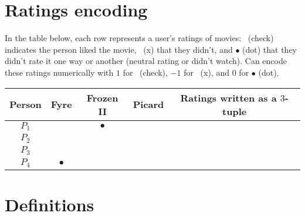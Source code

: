 \documentclass[12pt, oneside]{article}
\newcommand{\cmark}{\ding{51}}
\newcommand{\xmark}{\ding{55}}
\begin{document}
\begin{flushright}
\end{flushright} \section*{Ratings encoding}


In the table  below,  each row represents a user's ratings of movies: 
\cmark~(check) indicates the person liked the movie, \xmark~(x)
that they didn't, and $\bullet$ (dot) that they didn't rate it one way or 
another (neutral rating or didn't watch). Can encode
these ratings numerically with $1$ for \cmark~(check), $-1$ for \xmark~(x), 
and $0$ for $\bullet$ (dot).

\begin{center}
\begin{tabular}{c|ccc||c}
Person & Fyre & Frozen II & Picard & Ratings written as a  $3$-tuple\\
\hline
$P_1$     & \xmark & $\bullet$ & \cmark & \phantom{$(-1, 0, 1)$} \\
$P_2$     & \cmark & \cmark & \xmark & \phantom{$(1, 1, -1)$} \\
$P_3$     & \cmark & \cmark & \cmark & \phantom{$(1, 1, 1)$} \\
$P_4$     & $\bullet$ & \xmark & \cmark &  \\
\end{tabular}
\end{center} \vfill
\section*{Definitions}
\end{document}
